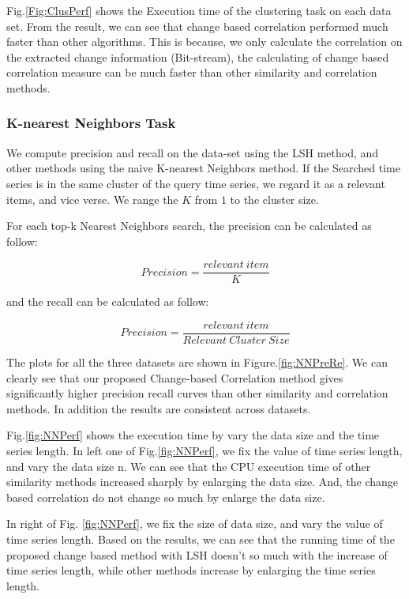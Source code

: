 Fig.\ref{Fig:ClusPerf} shows the Execution time of the clustering task on each data set. From the result, we can see that change based correlation performed much faster than other algorithms. This is because, we only calculate the correlation on the extracted change information (Bit-stream), the calculating of change based correlation measure can be much faster than other similarity and correlation methods.


\subsubsection{K-nearest Neighbors Task}

We compute precision and recall \cite{powers2011evaluation} on the data-set using the LSH method, and other methods using the naive K-nearest Neighbors method. 
If the Searched time series is in the same cluster of the query time series, we regard it as a relevant items, and vice verse. We range the $K$ from $1$ to the cluster size. 

For each top-k Nearest Neighbors search, the precision can be calculated as follow:

\begin{equation}
Precision =\frac{relevant~item}{K} 
\end{equation}

and the recall can be calculated as follow:

\begin{equation}
Precision =\frac{relevant~item}{Relevant~Cluster~Size} 
\end{equation}

The plots for all the three datasets are shown in Figure.\ref{fig:NNPreRe}.
We can clearly see that our proposed Change-based Correlation method gives significantly higher precision recall curves than other similarity and correlation methods. In addition the results are consistent across datasets.

Fig.\ref{fig:NNPerf} shows the execution time by vary the data size and the time series length.
In left one of Fig.\ref{fig:NNPerf}, we fix the value of time series length, and
vary the data size n. We can see that the CPU execution
time of other similarity methods increased sharply by enlarging the data size. 
And, the change based correlation do not change so much by enlarge the data size.

In right of Fig. \ref{fig:NNPerf}, we fix the size of data size, and vary the value of time series length. Based on the results, we can see that the running time of the proposed change based method with LSH doesn't so much with the increase of time series length, while other methods increase by enlarging the time series length.




